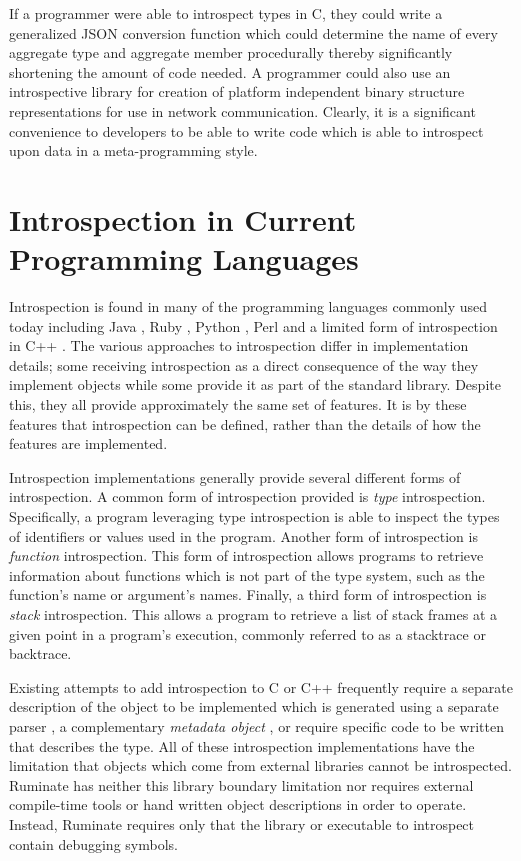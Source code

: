 \documentclass{report}
\begin{document}
If a programmer were able to introspect types in C, they could write a
generalized JSON conversion function which could determine the name of every
aggregate type and aggregate member procedurally thereby significantly
shortening the amount of code needed. A programmer could also use an
introspective library for creation of platform independent binary structure
representations for use in network communication. Clearly, it is a significant
convenience to developers to be able to write code which is able to introspect
upon data in a meta-programming style.

\section{Introspection in Current Programming Languages}
Introspection is found in many of the programming languages commonly used today
including Java \autocite{java-reflect}, Ruby \autocite{ruby-introspect},
Python \autocite{python-introspect}, Perl \autocite{perl-introspect} and a
limited form of introspection in C++ \autocite{cpp-rtti}. The various approaches
to introspection differ in implementation details; some receiving introspection
as a direct consequence of the way they implement objects while some provide it
as part of the standard library. Despite this, they all provide approximately
the same set of features. It is by these features that introspection can be
defined, rather than the details of how the features are implemented.

Introspection implementations generally provide several different forms of
introspection. A common form of introspection provided is \emph{type}
introspection. Specifically, a program leveraging type introspection is able to
inspect the types of identifiers or values used in the program. Another form of
introspection is \emph{function} introspection. This form of introspection
allows programs to retrieve information about functions which is not part of the
type system, such as the function's name or argument's names. Finally, a third
form of introspection is \emph{stack} introspection. This allows a program to
retrieve a list of stack frames at a given point in a program's execution,
commonly referred to as a stacktrace or backtrace.

Existing attempts to add introspection to C or C++ frequently require a separate
description of the object to be implemented which is generated using a separate
parser \autocite{seal-cpp}, a complementary \emph{metadata object}
\autocite{deBayser:2012:SRT:2415308.2415317}, or require specific code to be
written that describes the type. All of these introspection implementations have
the limitation that objects which come from external libraries cannot be
introspected. Ruminate has neither this library boundary limitation nor requires
external compile-time tools or hand written object descriptions in order to
operate. Instead, Ruminate requires only that the library or executable to
introspect contain debugging symbols.
\end{document}
